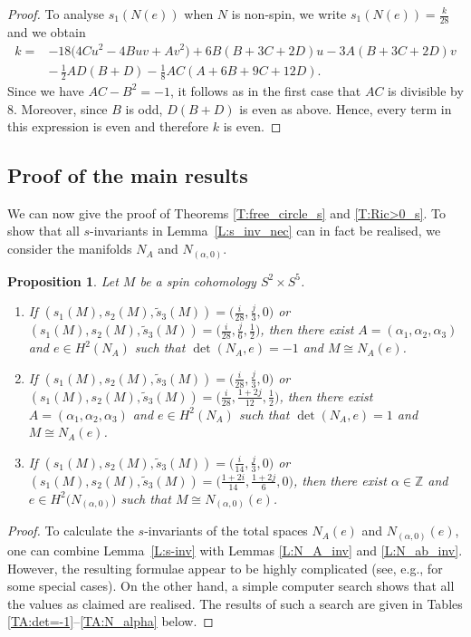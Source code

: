 \documentclass[pdftex]{sigma}
\numberwithin{equation}{section}
\newtheorem{Proposition}[Theorem]{Proposition}
\theoremstyle{definition}
\numberwithin{table}{section}
\newcommand{\Z}{\mathbb{Z}}
\begin{document}
\begin{proof}
	To analyse $s_1(N(e))$ when $N$ is non-spin, we write $s_1(N(e))=\frac{k}{28}$ and we obtain
	\begin{align*}
		k={}&{-}18\bigl(4Cu^2-4Buv+Av^2\bigr)+6B(B+3C+2D)u-3A(B+3C+2D)v\\
		&{-}\,\frac{1}{2}AD(B+D)-\frac{1}{8}AC(A+6B+9C+12D).
	\end{align*}
	Since we have $AC-B^2=-1$, it follows as in the first case that $AC$ is divisible by $8$. Moreover, since $B$ is odd, $D(B+D)$ is even as above. Hence, every term in this expression is even and therefore $k$ is even.		
\end{proof}

\subsection{Proof of the main results}

We can now give the proof of Theorems \ref{T:free_circle_s} and \ref{T:Ric>0_s}. To show that all $s$-invariants in Lemma~\ref{L:s_inv_nec} can in fact be realised, we consider the manifolds $N_A$ and $N_{(\alpha,0)}$.
\begin{Proposition}\label{P:s_inv_real}
	Let $M$ be a spin cohomology $S^2\times S^5$.
	\begin{enumerate}\itemsep=0pt
		\item[$(1)$] If $(s_1(M),s_2(M),\tilde{s}_3(M))=\bigl(\tfrac{i}{28},\tfrac{j}{3},0\bigr)$ or
        $(s_1(M),s_2(M),\tilde{s}_3(M))=\bigl(\tfrac{i}{28},\tfrac{j}{6},\tfrac{1}{2}\bigr)$,
		then there exist $A=(\alpha_1,\alpha_2,\alpha_3)$ and $e\in H^2(N_A)$ such that $\det(N_A,e)=-1$ and ${M\cong N_A(e)}$.
		\item[$(2)$] If
$(s_1(M),s_2(M),\tilde{s}_3(M))=\bigl(\tfrac{i}{28},\tfrac{j}{3},0\bigr)$ or $(s_1(M),s_2(M),\tilde{s}_3(M))=\bigl(\tfrac{i}{28},\tfrac{1+2j}{12},\tfrac{1}{2}\bigr)$,
		then there exist $A=(\alpha_1,\alpha_2,\alpha_3)$ and $e\in H^2(N_A)$ such that $\det(N_A,e)=1$ and ${M\cong N_A(e)}$.
		\item[$(3)$] If
$(s_1(M),s_2(M),\tilde{s}_3(M))=\bigl(\tfrac{i}{14},\tfrac{j}{3},0\bigr)$ or
        $(s_1(M),s_2(M),\tilde{s}_3(M))=\bigl(\tfrac{1+2i}{14},\tfrac{1+2j}{6},0\bigr)$,
then there exist $\alpha\in\Z$ and $e\in H^2\bigl(N_{(\alpha,0)}\bigr)$ such that $M\cong N_{(\alpha,0)}(e)$.
	\end{enumerate}
\end{Proposition}
\begin{proof}
	To calculate the $s$-invariants of the total spaces $N_A(e)$ and $N_{(\alpha,0)}(e)$, one can combine Lemma~\ref{L:s-inv} with Lemmas \ref{L:N_A_inv} and \ref{L:N_ab_inv}. However, the resulting formulae appear to be highly complicated (see, e.g., \cite[Propositions 5.2 and 7.11]{EZ14} for some special cases). On the other hand, a simple computer search shows that all the values as claimed are realised. The results of such a search are given in Tables \ref{TA:det=-1}--\ref{TA:N_alpha} below.
\end{proof}
\end{document}
